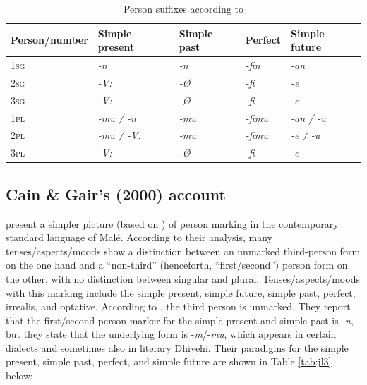 \documentclass[output=paper]{langsci/langscibook}
\begin{document}
\begin{table}
\begin{tabularx}{\textwidth}{lllll}
\hline
\textbf{Person/number} & \textbf{Simple present} & \textbf{Simple past} & \textbf{Perfect} & \textbf{Simple future}\\
\hline
\textsc{	1sg	}	&	\textit{	-n	}	&	\textit{	-n	}	&	\textit{	-fin	}	&	\textit{	-an	}	\\
\textsc{	2sg	}	&	\textit{	-V:	}	&	\textit{	-Ø	}	&	\textit{	-fi	}	&	\textit{	-e	}	\\
\textsc{	3sg	}	&	\textit{	-V:	}	&	\textit{	-Ø	}	&	\textit{	-fi	}	&	\textit{	-e	}	\\
\textsc{	1pl	}	&	\textit{	-mu / -n	}	&	\textit{	-mu	}	&	\textit{	-fimu	}	&	\textit{	-an / -ū	}	\\
\textsc{	2pl	}	&	\textit{	-mu / -V:	}	&	\textit{	-mu	}	&	\textit{	-fimu	}	&	\textit{	-e / -ū	}	\\
\textsc{	3pl	}	&	\textit{	-V:	}	&	\textit{	-Ø	}	&	\textit{	-fi	}	&	\textit{	-e	}	\\
\hline
\end{tabularx}
\caption{Person suffixes according to \cite{Fritz2002}}
\label{tab:jl2}	
\end{table}


\subsection{Cain \& Gair’s (2000) account}\label{s:jl2-2}

\cite[23--27]{CainGair2000} present a simpler picture (based on \citealt[54--63]{Cain2000}) of person marking in the contemporary standard language of Malé. According to their analysis, many tenses/aspects/moods show a distinction between an unmarked third-person form on the one hand and a “non-third” (henceforth, “first/second”) person form on the other, with no distinction between singular and plural. Tenses/aspects/moods with this marking include the simple present, simple future, simple past, perfect, irrealis, and optative. According to \citeauthor{CainGair2000}, the third person is unmarked. They report that the first/second-person marker for the simple present and simple past is -\textit{n}, but they state that the underlying form is -\textit{m}/-\textit{mu}, which appears in certain dialects and sometimes also in literary Dhivehi. Their paradigms for the simple present, simple past, perfect, and simple future are shown in Table \ref{tab:jl3} below:
\end{document}
